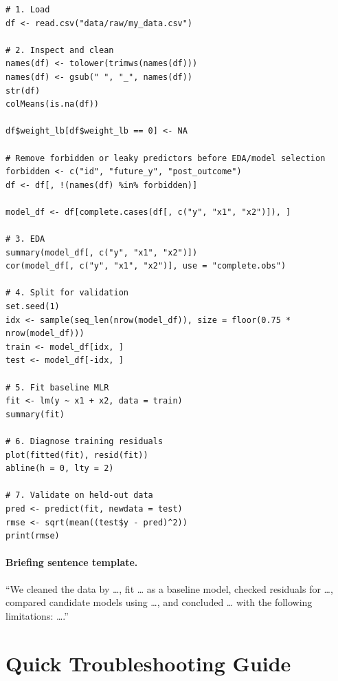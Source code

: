 \begin{verbatim}
# 1. Load
df <- read.csv("data/raw/my_data.csv")

# 2. Inspect and clean
names(df) <- tolower(trimws(names(df)))
names(df) <- gsub(" ", "_", names(df))
str(df)
colMeans(is.na(df))

df$weight_lb[df$weight_lb == 0] <- NA

# Remove forbidden or leaky predictors before EDA/model selection
forbidden <- c("id", "future_y", "post_outcome")
df <- df[, !(names(df) %in% forbidden)]

model_df <- df[complete.cases(df[, c("y", "x1", "x2")]), ]

# 3. EDA
summary(model_df[, c("y", "x1", "x2")])
cor(model_df[, c("y", "x1", "x2")], use = "complete.obs")

# 4. Split for validation
set.seed(1)
idx <- sample(seq_len(nrow(model_df)), size = floor(0.75 * nrow(model_df)))
train <- model_df[idx, ]
test <- model_df[-idx, ]

# 5. Fit baseline MLR
fit <- lm(y ~ x1 + x2, data = train)
summary(fit)

# 6. Diagnose training residuals
plot(fitted(fit), resid(fit))
abline(h = 0, lty = 2)

# 7. Validate on held-out data
pred <- predict(fit, newdata = test)
rmse <- sqrt(mean((test$y - pred)^2))
print(rmse)
\end{verbatim}

\paragraph{Briefing sentence template.} ``We cleaned the data by \ldots{}, fit \ldots{} as a baseline model, checked residuals for \ldots{}, compared candidate models using \ldots{}, and concluded \ldots{} with the following limitations: \ldots{}.''

\section{Quick Troubleshooting Guide}
\label{app:cookbook-troubleshooting-guide}

